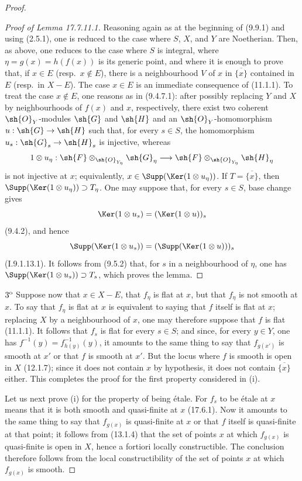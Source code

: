 \begin{proof}
\begin{proof}[Proof of Lemma 17.7.11.1]
Reasoning again as at the beginning of (9.9.1) and using (2.5.1), one is reduced to the case where $S$, $X$, and $Y$ are Noetherian.
Then, as above, one reduces to the case where $S$ is integral, where $\eta=g(x)=h(f(x))$ is its generic point, and where it is enough to prove that, if $x\in E$ (resp.\ $x\notin E$), there is a neighbourhood $V$ of $x$ in $\overline{\{x\}}$ contained in $E$ (resp.\ in $X-E$).
The case $x\in E$ is an immediate consequence of (11.1.1).
To treat the case $x\notin E$, one reasons as in (9.4.7.1): after possibly replacing $Y$ and $X$ by neighbourhoods of $f(x)$ and $x$, respectively, there exist two coherent $\sh{O}_Y$-modules $\sh{G}$ and $\sh{H}$ and an $\sh{O}_Y$-homomorphism $u:\sh{G}\to\sh{H}$ such that, for every $s\in S$, the homomorphism $u_s:\sh{G}_s\to\sh{H}_s$ is injective, whereas
\[
1\otimes u_\eta:\sh{F}\otimes_{\sh{O}_{Y_\eta}}\sh{G}_\eta
\longrightarrow
\sh{F}\otimes_{\sh{O}_{Y_\eta}}\sh{H}_\eta
\]
is not injective at $x$; equivalently, $x\in\Supp(\Ker(1\otimes u_\eta))$.
If $T=\overline{\{x\}}$, then $\Supp(\Ker(1\otimes u_\eta))\supset T_\eta$.
One may suppose that, for every $s\in S$, base change gives
\[
\Ker(1\otimes u_s)=(\Ker(1\otimes u))_s
\]
(9.4.2), and hence
\[
\Supp(\Ker(1\otimes u_s))=(\Supp(\Ker(1\otimes u)))_s
\]
(I.9.1.13.1).
It follows from (9.5.2) that, for $s$ in a neighbourhood of $\eta$, one has $\Supp(\Ker(1\otimes u_s))\supset T_s$, which proves the lemma.
\end{proof}

$3\textsuperscript{o}$ Suppose now that $x\in X-E$, that $f_\eta$ is flat at $x$, but that $f_\eta$ is not smooth at $x$.
To say that $f_\eta$ is flat at $x$ is equivalent to saying that $f$ itself is flat at $x$; replacing $X$ by a neighbourhood of $x$, one may therefore suppose that $f$ is flat (11.1.1).
It follows that $f_s$ is flat for every $s\in S$; and since, for every $y\in Y$, one has $f^{-1}(y)=f_{h(y)}^{-1}(y)$, it amounts to the same thing to say that $f_{g(x')}$ is smooth at $x'$ or that $f$ is smooth at $x'$.
But the locus where $f$ is smooth is open in $X$ (12.1.7); since it does not contain $x$ by hypothesis, it does not contain $\overline{\{x\}}$ either.
This completes the proof for the first property considered in (i).


Let us next prove (i) for the property of being \'etale.
For $f_s$ to be \'etale at $x$ means that it is both smooth and quasi-finite at $x$ (17.6.1).
Now it amounts to the same thing to say that $f_{g(x)}$ is quasi-finite at $x$ or that $f$ itself is quasi-finite at that point; it follows from (13.1.4) that the set of points $x$ at which $f_{g(x)}$ is quasi-finite is open in $X$, hence a fortiori locally constructible.
The conclusion therefore follows from the local constructibility of the set of points $x$ at which $f_{g(x)}$ is smooth.


\end{proof}
